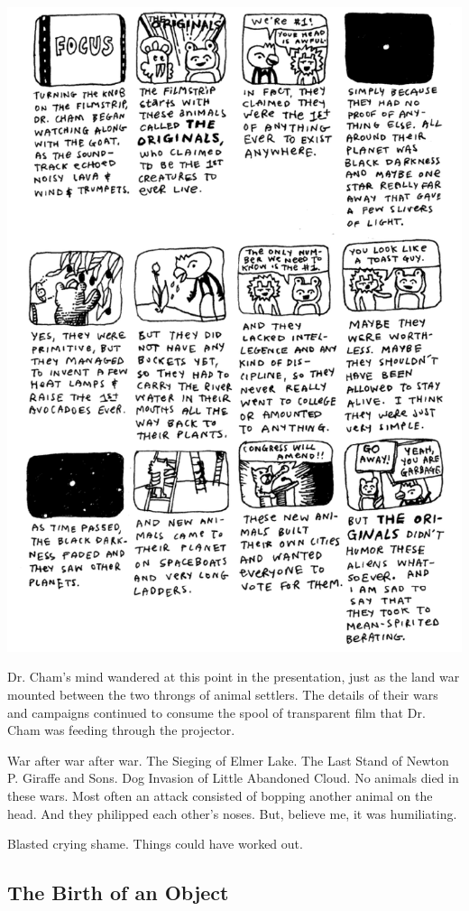 \documentclass[10pt,twoside]{report}
\begin{document}
	\includegraphics[width=1.0\textwidth]{cache/45.png}

Dr. Cham's mind wandered at this point in the presentation, just as
the land war mounted between the two throngs of animal settlers.  The
details of their wars and campaigns continued to consume the spool of
transparent film that Dr. Cham was feeding through the projector.

War after war after war.  The Sieging of Elmer Lake.  The Last Stand
of Newton P. Giraffe and Sons.  Dog Invasion of Little Abandoned
Cloud.  No animals died in these wars.  Most often an attack consisted
of bopping another animal on the head.  And they philipped each
other's noses.  But, believe me, it was humiliating.

Blasted crying shame.  Things could have worked out.



\subsection{The Birth of an Object}
\end{document}
